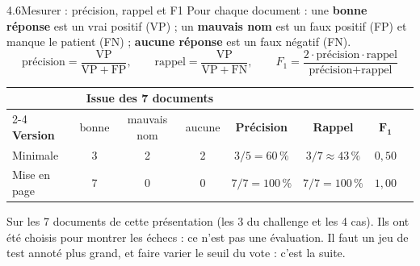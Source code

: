 \documentclass[11pt,aspectratio=169]{beamer}
\newcommand{\pct}[1]{#1\,\%}
\begin{document}
\begin{frame}{4.6\quad Mesurer : précision, rappel et F1}
  \small
  Pour chaque document : une \textbf{bonne réponse} est un vrai positif (VP) ; un
  \textbf{mauvais nom} est un faux positif (FP) et manque le patient (FN) ; \textbf{aucune
  réponse} est un faux négatif (FN).
  \[
    \text{précision} = \frac{\mathrm{VP}}{\mathrm{VP} + \mathrm{FP}}, \qquad
    \text{rappel} = \frac{\mathrm{VP}}{\mathrm{VP} + \mathrm{FN}}, \qquad
    F_1 = \frac{2 \cdot \text{précision} \cdot \text{rappel}}{\text{précision} + \text{rappel}}
  \]

  \begin{center}
    \renewcommand{\arraystretch}{1.25}
    \setlength{\tabcolsep}{5pt}
    \begin{tabular}{@{}lccccccc@{}}
      \toprule
      & \multicolumn{3}{c}{\textbf{Issue des 7 documents}} & & & \\
      \cmidrule(lr){2-4}
      \textbf{Version} & bonne & mauvais nom & aucune & \textbf{Précision} & \textbf{Rappel}
        & $\mathbf{F_1}$ \\
      \midrule
      Minimale & 3 & 2 & 2 & $3/5 = \pct{60}$ & $3/7 \approx \pct{43}$ & $0{,}50$ \\
      Mise en page & 7 & 0 & 0 & $7/7 = \pct{100}$ & $7/7 = \pct{100}$ & $1{,}00$ \\
      \bottomrule
    \end{tabular}
  \end{center}

  \footnotesize
  Sur les 7 documents de cette présentation (les 3 du challenge et les 4 cas). Ils ont été
  choisis pour montrer les échecs : ce n'est pas une évaluation. Il faut un jeu de test annoté
  plus grand, et faire varier le seuil du vote : c'est la suite.
\end{frame}
\end{document}
